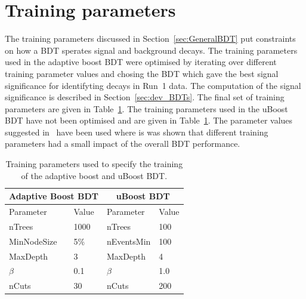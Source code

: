 \section{Training parameters}
The training parameters discussed in Section~\ref{sec:GeneralBDT} put constraints on how a BDT sperates signal and background decays. 
The training parameters used in the adaptive boost BDT were optimised by iterating over different training parameter values and chosing the BDT which gave the best signal significance for identifyting \bhh decays in Run~1 data. The computation of the signal significance is described in Section~\ref{sec:dev_BDTs}. %
The final set of training parameters are given in Table~\ref{tab:ELtrainingparamss}. %
The training parameters used in the uBoost BDT have not been optimised and are given in Table~\ref{tab:ELtrainingparamss}. The parameter values suggested in~\cite{Stevens:2013dya} have been used where is was shown that different training parameters had a small impact of the overall BDT performance. %
\begin{table}[htbp]
\begin{center}
\begin{tabular}{ll|ll}
\hline
\multicolumn{2}{c}{Adaptive Boost BDT} & \multicolumn{2}{c}{uBoost BDT} \\ \hline
Parameter & Value & Parameter & Value\\ \hline
nTrees & 1000 &  nTrees & 100\\
MinNodeSize & 5$\%$ & nEventsMin & 100 \\
MaxDepth & 3 & MaxDepth & 4 \\
$\beta$ & 0.1 & $\beta$ & 1.0 \\
nCuts & 30 & nCuts & 200 \\
\hline
\end{tabular}
\vspace{0.7cm}
\caption{Training parameters used to specify the training of the adaptive boost and uBoost BDT.}
\label{tab:ELtrainingparamss}
\end{center}
\vspace{-1.0cm}
\end{table}



